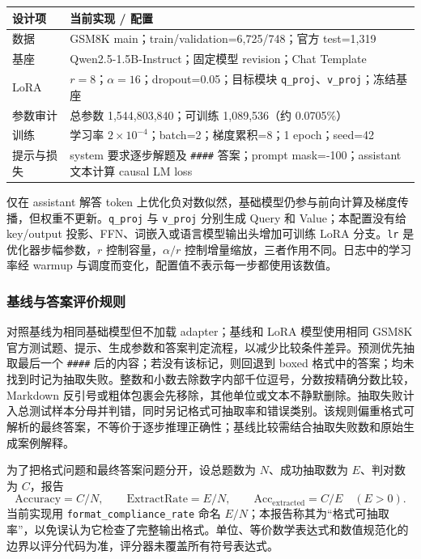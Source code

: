 \documentclass[UTF8,a4paper,12pt,fontset=none]{ctexart}
\begin{document}
\noindent\begin{tabularx}{\textwidth}{>{\raggedright\arraybackslash}p{}Y}
\toprule
设计项 & 当前实现 / 配置 \\
\midrule
数据 & GSM8K main；train/validation=6,725/748；官方 test=1,319 \\
基座 & Qwen2.5-1.5B-Instruct；固定模型 revision；Chat Template \\
LoRA & $r=8$；$\alpha=16$；dropout=0.05；目标模块 \texttt{q\_proj}、\texttt{v\_proj}；冻结基座 \\
参数审计 & 总参数 1,544,803,840；可训练 1,089,536（约 0.0705\%） \\
训练 & 学习率 $2\times10^{-4}$；batch=2；梯度累积=8；1 epoch；seed=42 \\
提示与损失 & system 要求逐步解题及 \texttt{\#\#\#\#} 答案；prompt mask=-100；assistant 文本计算 causal LM loss \\
\bottomrule
\end{tabularx}

仅在 assistant 解答 token 上优化负对数似然，基础模型仍参与前向计算及梯度传播，但权重不更新。\texttt{q\_proj} 与 \texttt{v\_proj} 分别生成 Query 和 Value；本配置没有给 key/output 投影、FFN、词嵌入或语言模型输出头增加可训练 LoRA 分支。\texttt{lr} 是优化器步幅参数，$r$ 控制容量，$\alpha/r$ 控制增量缩放，三者作用不同。日志中的学习率经 warmup 与调度而变化，配置值不表示每一步都使用该数值。

\subsubsection{基线与答案评价规则}
对照基线为相同基础模型但不加载 adapter；基线和 LoRA 模型使用相同 GSM8K 官方测试题、提示、生成参数和答案判定流程，以减少比较条件差异。预测优先抽取最后一个 \texttt{\#\#\#\#} 后的内容；若没有该标记，则回退到 boxed 格式中的答案；均未找到时记为抽取失败。整数和小数去除数字内部千位逗号，分数按精确分数比较，Markdown 反引号或粗体包裹会先移除，其他单位或文本不静默删除。抽取失败计入总测试样本分母并判错，同时另记格式可抽取率和错误类别。该规则偏重格式可解析的最终答案，不等价于逐步推理正确性；基线比较需结合抽取失败数和原始生成案例解释\cite{gsm8k}。

为了把格式问题和最终答案问题分开，设总题数为 $N$、成功抽取数为 $E$、判对数为 $C$，报告
\[
 \mathrm{Accuracy}=C/N,\qquad \mathrm{ExtractRate}=E/N,\qquad
 \mathrm{Acc}_{\mathrm{extracted}}=C/E\quad(E>0).
\]
当前实现用 \texttt{format\_compliance\_rate} 命名 $E/N$；本报告称其为“格式可抽取率”，以免误认为它检查了完整输出格式。单位、等价数学表达式和数值规范化的边界以评分代码为准，评分器未覆盖所有符号表达式。
\end{document}
